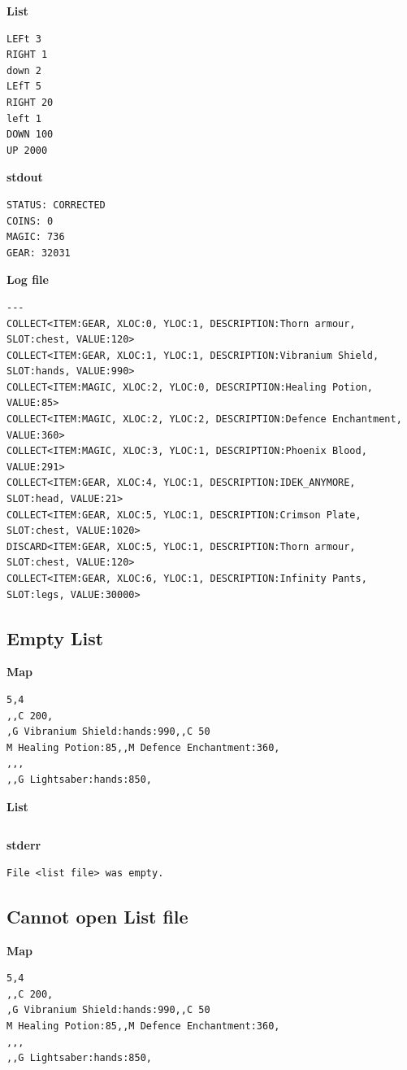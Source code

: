 \documentclass{article}
\begin{document}
\textbf{List}
\begin{lstlisting}
LEFt 3
RIGHT 1
down 2
LEfT 5
RIGHT 20
left 1
DOWN 100
UP 2000
\end{lstlisting}
\pagebreak

\textbf{stdout}
\begin{lstlisting}
STATUS: CORRECTED
COINS: 0
MAGIC: 736
GEAR: 32031
\end{lstlisting}

\textbf{Log file}
\begin{lstlisting}
---
COLLECT<ITEM:GEAR, XLOC:0, YLOC:1, DESCRIPTION:Thorn armour, SLOT:chest, VALUE:120>
COLLECT<ITEM:GEAR, XLOC:1, YLOC:1, DESCRIPTION:Vibranium Shield, SLOT:hands, VALUE:990>
COLLECT<ITEM:MAGIC, XLOC:2, YLOC:0, DESCRIPTION:Healing Potion, VALUE:85>
COLLECT<ITEM:MAGIC, XLOC:2, YLOC:2, DESCRIPTION:Defence Enchantment, VALUE:360>
COLLECT<ITEM:MAGIC, XLOC:3, YLOC:1, DESCRIPTION:Phoenix Blood, VALUE:291>
COLLECT<ITEM:GEAR, XLOC:4, YLOC:1, DESCRIPTION:IDEK_ANYMORE, SLOT:head, VALUE:21>
COLLECT<ITEM:GEAR, XLOC:5, YLOC:1, DESCRIPTION:Crimson Plate, SLOT:chest, VALUE:1020>
DISCARD<ITEM:GEAR, XLOC:5, YLOC:1, DESCRIPTION:Thorn armour, SLOT:chest, VALUE:120>
COLLECT<ITEM:GEAR, XLOC:6, YLOC:1, DESCRIPTION:Infinity Pants, SLOT:legs, VALUE:30000>
\end{lstlisting}

\subsection{Empty List}
\quad \textbf{Map}
\begin{lstlisting}
5,4
,,C 200,
,G Vibranium Shield:hands:990,,C 50
M Healing Potion:85,,M Defence Enchantment:360,
,,,
,,G Lightsaber:hands:850,
\end{lstlisting}

\textbf{List}
\begin{lstlisting}

\end{lstlisting}
\pagebreak

\textbf{stderr}
\begin{lstlisting}
File <list file> was empty.
\end{lstlisting}

\subsection{Cannot open List file}
\quad \textbf{Map}
\begin{lstlisting}
5,4
,,C 200,
,G Vibranium Shield:hands:990,,C 50
M Healing Potion:85,,M Defence Enchantment:360,
,,,
,,G Lightsaber:hands:850,
\end{lstlisting}
\end{document}
